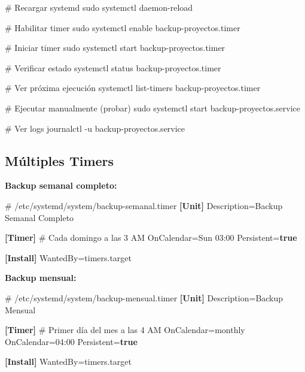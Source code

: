 \documentclass[
  doc,
  floatsintext,
  longtable,
  a4paper,
  nolmodern,
  notxfonts,
  notimes,
  12pt,
  colorlinks=true,linkcolor=blue,citecolor=blue,urlcolor=blue]{apa7}
\newenvironment{Shaded}{\begin{snugshade}}{\end{snugshade}}
\newcommand{\AttributeTok}[1]{\textcolor[rgb]{0.40,0.45,0.13}{#1}}
\newcommand{\CommentTok}[1]{\textcolor[rgb]{0.37,0.37,0.37}{#1}}
\newcommand{\DataTypeTok}[1]{\textcolor[rgb]{0.68,0.00,0.00}{#1}}
\newcommand{\ExtensionTok}[1]{\textcolor[rgb]{0.00,0.23,0.31}{#1}}
\newcommand{\FunctionTok}[1]{\textcolor[rgb]{0.28,0.35,0.67}{#1}}
\newcommand{\KeywordTok}[1]{\textcolor[rgb]{0.00,0.23,0.31}{\textbf{#1}}}
\newcommand{\NormalTok}[1]{\textcolor[rgb]{0.00,0.23,0.31}{#1}}
\newcommand{\OtherTok}[1]{\textcolor[rgb]{0.00,0.23,0.31}{#1}}
\newcommand{\StringTok}[1]{\textcolor[rgb]{0.13,0.47,0.30}{#1}}
\begin{document}
\begin{Shaded}
\begin{Highlighting}[]
\CommentTok{\# Recargar systemd}
\FunctionTok{sudo}\NormalTok{ systemctl daemon{-}reload}

\CommentTok{\# Habilitar timer}
\FunctionTok{sudo}\NormalTok{ systemctl enable backup{-}proyectos.timer}

\CommentTok{\# Iniciar timer}
\FunctionTok{sudo}\NormalTok{ systemctl start backup{-}proyectos.timer}

\CommentTok{\# Verificar estado}
\ExtensionTok{systemctl}\NormalTok{ status backup{-}proyectos.timer}

\CommentTok{\# Ver próxima ejecución}
\ExtensionTok{systemctl}\NormalTok{ list{-}timers backup{-}proyectos.timer}

\CommentTok{\# Ejecutar manualmente (probar)}
\FunctionTok{sudo}\NormalTok{ systemctl start backup{-}proyectos.service}

\CommentTok{\# Ver logs}
\ExtensionTok{journalctl} \AttributeTok{{-}u}\NormalTok{ backup{-}proyectos.service}
\end{Highlighting}
\end{Shaded}

\subsection{Múltiples Timers}\label{muxfaltiples-timers}

\textbf{Backup semanal completo:}

\begin{Shaded}
\begin{Highlighting}[]
\CommentTok{\# /etc/systemd/system/backup{-}semanal.timer}
\KeywordTok{[Unit]}
\DataTypeTok{Description}\OtherTok{=}\StringTok{Backup Semanal Completo}

\KeywordTok{[Timer]}
\CommentTok{\# Cada domingo a las 3 AM}
\DataTypeTok{OnCalendar}\OtherTok{=}\StringTok{Sun 03:00}
\DataTypeTok{Persistent}\OtherTok{=}\KeywordTok{true}

\KeywordTok{[Install]}
\DataTypeTok{WantedBy}\OtherTok{=}\StringTok{timers.target}
\end{Highlighting}
\end{Shaded}

\textbf{Backup mensual:}

\begin{Shaded}
\begin{Highlighting}[]
\CommentTok{\# /etc/systemd/system/backup{-}mensual.timer}
\KeywordTok{[Unit]}
\DataTypeTok{Description}\OtherTok{=}\StringTok{Backup Mensual}

\KeywordTok{[Timer]}
\CommentTok{\# Primer día del mes a las 4 AM}
\DataTypeTok{OnCalendar}\OtherTok{=}\StringTok{monthly}
\DataTypeTok{OnCalendar}\OtherTok{=}\StringTok{04:00}
\DataTypeTok{Persistent}\OtherTok{=}\KeywordTok{true}

\KeywordTok{[Install]}
\DataTypeTok{WantedBy}\OtherTok{=}\StringTok{timers.target}
\end{Highlighting}
\end{Shaded}
\end{document}
